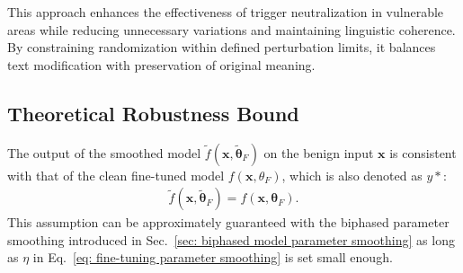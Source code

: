 
This approach enhances the effectiveness of trigger neutralization in vulnerable areas while reducing unnecessary variations and maintaining linguistic coherence. By constraining randomization within defined perturbation limits, it balances text modification with preservation of original meaning.



\subsection{Theoretical Robustness Bound}
\label{sec: theory}

\begin{assumption}
\label{assump: effective parameter smoothing}
The output of the smoothed model $\tilde{f}(\mathbf{x}, \tilde{\bm{\theta}}_F)$ on the benign input $\mathbf{x}$ is consistent with that of the clean fine-tuned model $f(\mathbf{x}, \theta_F)$, which is also denoted as $y*$:
\begin{equation}
\begin{aligned}
\tilde{f}(\mathbf{x}, \tilde{\bm{\theta}}_F) = f(\mathbf{x}, \mathbf{\theta}_F).
\end{aligned}
\label{eq: effective parameter smoothing}
\end{equation} 
This assumption can be approximately guaranteed with the biphased parameter smoothing introduced in Sec.~\ref{sec: biphased model parameter smoothing} as long as $\eta$ in Eq.~\ref{eq: fine-tuning parameter smoothing} is set small enough.
   
\end{assumption}


